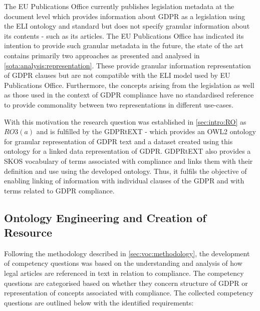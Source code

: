 The EU Publications Office currently publishes legislation metadata at the document level which provides information about GDPR as a legislation using the ELI ontology and standard \cite{thomas_european_2019} but does not specify granular information about its contents - such as its articles. The EU Publications Office has indicated its intention to provide such granular metadata in the future, the state of the art contains primarily two approaches as presented and analysed in \autoref{sota:analysis:representation}. These provide granular information representation of GDPR clauses but are not compatible with the ELI model used by EU Publications Office. Furthermore, the concepts arising from the legislation as well as those used in the context of GDPR compliance have no standardised reference to provide commonality between two representations in different use-cases. 

With this motivation the research question was established in \autoref{sec:intro:RO} as $RO3(a)$ and is fulfilled by the GDPRtEXT - which provides an OWL2 ontology for granular representation of GDPR text and a dataset created using this ontology for a linked data representation of GDPR. GDPRtEXT also provides a SKOS vocabulary of terms associated with compliance and links them with their definition and use using the developed ontology. Thus, it fulfils the objective of enabling linking of information with individual clauses of the GDPR and with terms related to GDPR compliance.

\subsection{Ontology Engineering and Creation of Resource}\label{sec:voc:gdprtext-engineering}
Following the methodology described in \autoref{sec:voc:methodology}, the development of competency questions was based on the understanding and analysis of how legal articles are referenced in text in relation to compliance. The competency questions are categorised based on whether they concern structure of GDPR or representation of concepts associated with compliance. The collected competency questions are outlined below with the identified requirements:

